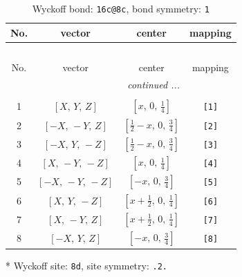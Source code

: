 \documentclass[fleqn,8pt]{jsarticle}
\begin{document}
\begin{longtable}{cccc}
\caption{Wyckoff bond: {\tt 16c@8c}, bond symmetry: {\tt 1}}
 \\
 \hline \hline
No. & vector & center & mapping \\ \hline \endfirsthead

\multicolumn{3}{l}{\tablename\ \thetable{}} \\
 \hline \hline
No. & vector & center & mapping \\ \hline \endhead

 \hline \hline
\multicolumn{3}{r}{\footnotesize\it continued ...} \\ \endfoot

 \hline \hline
\multicolumn{3}{r}{} \\ \endlastfoot

1 & $\left[ X,\, Y,\, Z \right]$ & $\left[ x,\, 0,\, \frac{1}{4} \right]$ & {\tt [1]} \\ \hline
2 & $\left[ - X,\, - Y,\, Z \right]$ & $\left[ \frac{1}{2} - x,\, 0,\, \frac{3}{4} \right]$ & {\tt [2]} \\ \hline
3 & $\left[ - X,\, Y,\, - Z \right]$ & $\left[ \frac{1}{2} - x,\, 0,\, \frac{3}{4} \right]$ & {\tt [3]} \\ \hline
4 & $\left[ X,\, - Y,\, - Z \right]$ & $\left[ x,\, 0,\, \frac{1}{4} \right]$ & {\tt [4]} \\ \hline
5 & $\left[ - X,\, - Y,\, - Z \right]$ & $\left[ - x,\, 0,\, \frac{3}{4} \right]$ & {\tt [5]} \\ \hline
6 & $\left[ X,\, Y,\, - Z \right]$ & $\left[ x + \frac{1}{2},\, 0,\, \frac{1}{4} \right]$ & {\tt [6]} \\ \hline
7 & $\left[ X,\, - Y,\, Z \right]$ & $\left[ x + \frac{1}{2},\, 0,\, \frac{1}{4} \right]$ & {\tt [7]} \\ \hline
8 & $\left[ - X,\, Y,\, Z \right]$ & $\left[ - x,\, 0,\, \frac{3}{4} \right]$ & {\tt [8]} \\
\end{longtable}
* Wyckoff site: {\tt 8d}, site symmetry: {\tt .2.}
\renewcommand{\arraystretch}{1.2}
\end{document}
